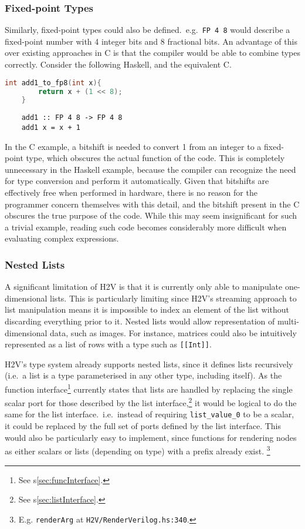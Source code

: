 \documentclass[english,onecolumn]{scrartcl}
\begin{document}
\subsubsection{Fixed-point Types}
Similarly, fixed-point types could also be defined.\ e.g.\ \texttt{FP 4 8} would describe a fixed-point number with 4 integer bits
and 8 fractional bits. An advantage of this over existing approaches in C is that the compiler would be able to combine types
correctly. Consider the following Haskell, and the equivalent C.

\begin{lstlisting}[language=C]
    int add1_to_fp8(int x){
        return x + (1 << 8);
    }
\end{lstlisting}

\begin{lstlisting}
    add1 :: FP 4 8 -> FP 4 8
    add1 x = x + 1
\end{lstlisting}

In the C example, a bitshift is needed to convert 1 from an integer to a fixed-point type, which obscures the actual function of
the code. This is completely unnecessary in the Haskell example, because the compiler can recognize the need for type conversion
and perform it automatically. Given that bitshifts are effectively free when performed in hardware, there is no reason for the
programmer concern themselves with this detail, and the bitshift present in the C obscures the true purpose of the code. While
this may seem insignificant for such a trivial example, reading such code becomes considerably more difficult when evaluating
complex expressions.


\subsubsection{Nested Lists}
A significant limitation of H2V is that it is currently only able to manipulate one-dimensional lists. This is particularly
limiting since H2V's streaming approach to list manipulation means it is impossible to index an element of the list without
discarding everything prior to it. Nested lists would allow representation of multi-dimensional data, such as images.
For instance, matrices could also be intuitively represented as a list of rows with a type such as \texttt{[[Int]]}.

H2V's type system already supports nested lists, since it defines lists recursively (i.e.\ a list is a type parameterised in any
other type, including itself). As the function interface\footnote{See s\ref{sec:funcInterface}.} currently states that lists are
handled by replacing the single scalar port for those described by the list interface,\footnote{See s\ref{sec:listInterface}.}
it would be logical to do the same for the list interface.\ i.e.\ instead of requiring \texttt{list\_value\_0} to be a scalar, it
could be replaced by the full set of ports defined by the list interface. This would also be particularly easy to implement, since
functions for rendering nodes as either scalars or lists (depending on type) with a prefix already exist.%
\footnote{E.g. \texttt{renderArg} at \texttt{H2V/RenderVerilog.hs:340}.}
\end{document}
